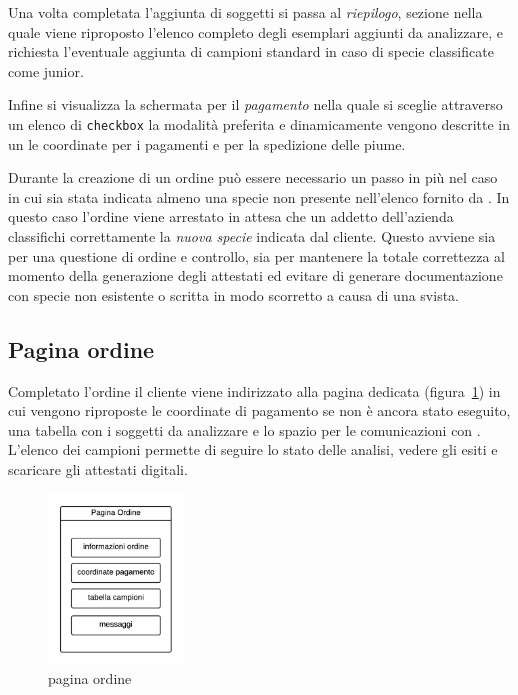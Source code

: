 Una volta completata l'aggiunta di soggetti si passa al \emph{riepilogo}, sezione nella quale viene riproposto l'elenco completo degli esemplari aggiunti da analizzare, e richiesta l'eventuale aggiunta di campioni standard in caso di specie classificate come junior.

Infine si visualizza la schermata per il \emph{pagamento} nella quale si sceglie attraverso un elenco di \texttt{checkbox} la modalità preferita e dinamicamente vengono descritte in un  le coordinate per i pagamenti e per la spedizione delle piume.

Durante la creazione di un ordine può essere necessario un passo in più nel caso in cui sia stata indicata almeno una specie non presente nell'elenco fornito da {\fem}. In questo caso l'ordine viene arrestato in attesa che un addetto dell'azienda classifichi correttamente la \emph{nuova specie} indicata dal cliente. Questo avviene sia per una questione di ordine e controllo, sia per mantenere la totale correttezza al momento della generazione degli attestati ed evitare di generare documentazione con specie non esistente o scritta in modo scorretto a causa di una svista.

\subsection*{Pagina ordine}
\label{subs:po}
Completato l'ordine il cliente viene indirizzato alla pagina dedicata (figura~\ref{fig:pagina-ordine-s}) in cui vengono riproposte le coordinate di pagamento se non è ancora stato eseguito, una tabella con i soggetti da analizzare e lo spazio per le comunicazioni con {\fem}. L'elenco dei campioni permette di seguire lo stato delle analisi, vedere gli esiti e  scaricare gli attestati digitali.

\begin{figure}
 \centering
 \includegraphics[width=0.32\textwidth]{images/pagina-ordine-s} 
 \caption{pagina ordine}
 \label{fig:pagina-ordine-s}
\end{figure}

